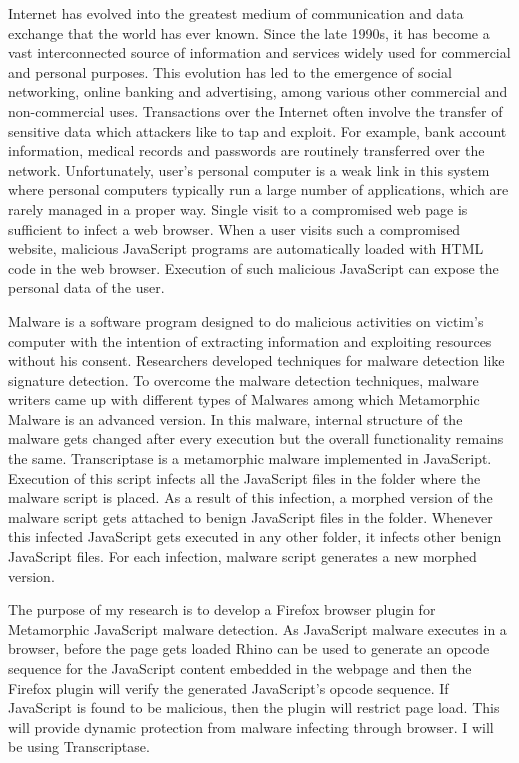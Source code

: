 Internet has evolved into the greatest medium of communication and data exchange that the world has ever known. Since the late 1990s, it has become a vast interconnected source of information and services widely used for commercial and personal purposes. This evolution has led to the emergence of social networking, online banking and advertising, among various other commercial and non-commercial uses. Transactions over the Internet often involve the transfer of sensitive data which attackers like to tap and exploit. For example, bank account information, medical records and passwords are routinely transferred over the network. Unfortunately, user’s personal computer is a weak link in this system where personal computers typically run a large number of applications, which are rarely managed in a proper way. Single visit to a compromised web page is sufficient to infect a web browser. When a user visits such a compromised website, malicious JavaScript programs are automatically loaded with HTML code in the web browser. Execution of such malicious JavaScript can expose the personal data of the user. 

Malware is a software program designed to do malicious activities on victim’s computer with the intention of extracting information and exploiting resources without his consent. Researchers developed techniques for malware detection like signature detection. To overcome the malware detection techniques, malware writers came up with different types of Malwares among which Metamorphic Malware is an advanced version. In this malware, internal structure of the malware gets changed after every execution but the overall functionality remains the same. Transcriptase is a metamorphic malware implemented in JavaScript. Execution of this script infects all the JavaScript files in the folder where the malware script is placed. As a result of this infection, a morphed version of the malware script gets attached to benign JavaScript files in the folder. Whenever this infected JavaScript gets executed in any other folder, it infects other benign JavaScript files. For each infection, malware script generates a new morphed version.

The purpose of my research is to develop a Firefox browser plugin for Metamorphic JavaScript malware detection. As JavaScript malware executes in a browser, before the page gets loaded Rhino can be used to generate an opcode sequence for the JavaScript content embedded in the webpage and then the Firefox plugin will verify the generated JavaScript’s opcode sequence. If JavaScript is found to be malicious, then the plugin will restrict page load. This will provide dynamic protection from malware infecting through browser. I will be using Transcriptase.

